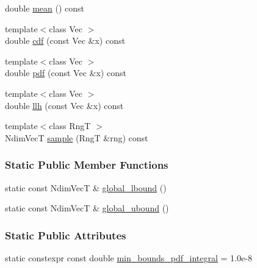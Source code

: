 \begin{DoxyCompactItemize}
double \hyperlink{classprior__hessian_1_1TruncatedMultivariateDist_ae1a5f45b8f7313065ece69adebce9b42}{mean} () const 
\item 
{\footnotesize template$<$class Vec $>$ }\\double \hyperlink{classprior__hessian_1_1TruncatedMultivariateDist_a526b5f27f4bf3dad71b5e9edfeec1701}{cdf} (const Vec \&x) const 
\item 
{\footnotesize template$<$class Vec $>$ }\\double \hyperlink{classprior__hessian_1_1TruncatedMultivariateDist_a607595eabeeff99074aef8dbe8bb9303}{pdf} (const Vec \&x) const 
\item 
{\footnotesize template$<$class Vec $>$ }\\double \hyperlink{classprior__hessian_1_1TruncatedMultivariateDist_a66dbab7cc080efc0fec440bde5db18d5}{llh} (const Vec \&x) const 
\item 
{\footnotesize template$<$class RngT $>$ }\\Ndim\+VecT \hyperlink{classprior__hessian_1_1TruncatedMultivariateDist_a04cd514396552ae9e142372612fc2ec9}{sample} (RngT \&rng) const 
\end{DoxyCompactItemize}
\subsubsection*{Static Public Member Functions}
\begin{DoxyCompactItemize}
\item 
static const Ndim\+VecT \& \hyperlink{classprior__hessian_1_1TruncatedMultivariateDist_aa5106ba7f2aaff8598e476135494c565}{global\+\_\+lbound} ()
\item 
static const Ndim\+VecT \& \hyperlink{classprior__hessian_1_1TruncatedMultivariateDist_a80b96f61399d3729ac7d914bd5aa40c3}{global\+\_\+ubound} ()
\end{DoxyCompactItemize}
\subsubsection*{Static Public Attributes}
\begin{DoxyCompactItemize}
\item 
static constexpr const double \hyperlink{classprior__hessian_1_1TruncatedMultivariateDist_a174f1cebf918193f5b10b4ecfa3740ec}{min\+\_\+bounds\+\_\+pdf\+\_\+integral} = 1.\+0e-\/8
\end{DoxyCompactItemize}
